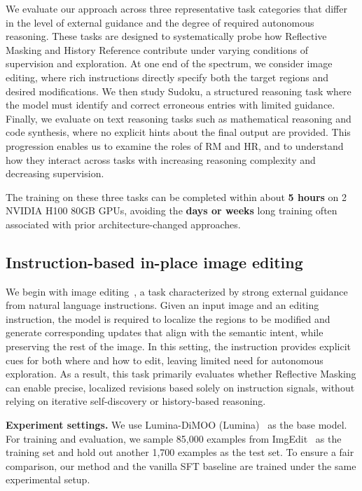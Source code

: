 \documentclass{llmxive}
\providecommand{\methodfull}{Reflective Masking\xspace}
\providecommand{\method}{RM\xspace}
\providecommand{\temporalmethodfull}{History Reference\xspace}
\providecommand{\temporalmethod}{HR\xspace}
\begin{document}
We evaluate our approach across three representative task categories that differ in the level of external guidance and the degree of required autonomous reasoning. These tasks are designed to systematically probe how \methodfull and \temporalmethodfull contribute under varying conditions of supervision and exploration. At one end of the spectrum, we consider image editing, where rich instructions directly specify both the target regions and desired modifications. We then study Sudoku, a structured reasoning task where the model must identify and correct erroneous entries with limited guidance. Finally, we evaluate on text reasoning tasks such as mathematical reasoning and code synthesis, where no explicit hints about the final output are provided. This progression enables us to examine the roles of \method and \temporalmethod, and to understand how they interact across tasks with increasing reasoning complexity and decreasing supervision.

The training on these three tasks can be completed within about \textbf{5 hours} on 2 NVIDIA H100 80GB GPUs, avoiding the \textbf{days or weeks} long training often associated with prior architecture-changed approaches.



\subsection{Instruction-based in-place image editing}
\label{sec:image-editing-experiments}

We begin with image editing~\citep{brooks2023instructpix2pix,zhang2023magicbrush,sheynin2024emu,hertz2022prompt}, a task characterized by strong external guidance from natural language instructions. Given an input image and an editing instruction, the model is required to localize the regions to be modified and generate corresponding updates that align with the semantic intent, while preserving the rest of the image. In this setting, the instruction provides explicit cues for both where and how to edit, leaving limited need for autonomous exploration. As a result, this task primarily evaluates whether \methodfull can enable precise, localized revisions based solely on instruction signals, without relying on iterative self-discovery or history-based reasoning.

\textbf{Experiment settings.}
We use Lumina-DiMOO (Lumina)~\citep{xin2025lumina} as the base model. For training and evaluation, we sample 85,000 examples from ImgEdit~\citep{ye2025imgedit} as the training set and hold out another 1,700 examples as the test set. To ensure a fair comparison, our method and the vanilla SFT baseline are trained under the same experimental setup.
\end{document}

